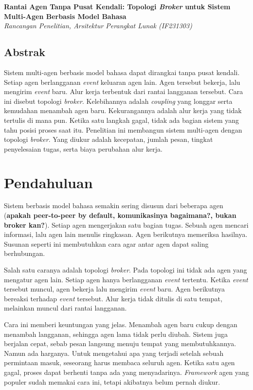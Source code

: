 \documentclass[11pt,a4paper]{article}
\begin{document}
\begin{center}
  {\LARGE\bfseries Rantai Agen Tanpa Pusat Kendali: Topologi \textit{Broker} untuk Sistem Multi-Agen Berbasis Model Bahasa}\\[0.6em]
  {\small\itshape Rancangan Penelitian, Arsitektur Perangkat Lunak (IF231303)}
\end{center}

\vspace{1em}

\subsection*{Abstrak}

Sistem multi-agen berbasis model bahasa dapat dirangkai tanpa pusat kendali. Setiap agen berlangganan \textit{event} keluaran agen lain. Agen tersebut bekerja, lalu mengirim \textit{event} baru. Alur kerja terbentuk dari rantai langganan tersebut. Cara ini disebut topologi \textit{broker}. Kelebihannya adalah \textit{coupling} yang longgar serta kemudahan menambah agen baru. Kekurangannya adalah alur kerja yang tidak tertulis di mana pun. Ketika satu langkah gagal, tidak ada bagian sistem yang tahu posisi proses saat itu. Penelitian ini membangun sistem multi-agen dengan topologi \textit{broker}. Yang diukur adalah kecepatan, jumlah pesan, tingkat penyelesaian tugas, serta biaya perubahan alur kerja.

\section{Pendahuluan}

Sistem berbasis model bahasa semakin sering disusun dari beberapa agen (\textbf{apakah peer-to-peer by default, komunikasinya bagaimana?, bukan broker kan?}). Setiap agen mengerjakan satu bagian tugas. Sebuah agen mencari informasi, lalu agen lain menulis ringkasan. Agen berikutnya memeriksa hasilnya. Susunan seperti ini membutuhkan cara agar antar agen dapat saling berhubungan.

Salah satu caranya adalah topologi \textit{broker}. Pada topologi ini tidak ada agen yang mengatur agen lain. Setiap agen hanya berlangganan \textit{event} tertentu. Ketika \textit{event} tersebut muncul, agen bekerja lalu mengirim \textit{event} baru. Agen berikutnya bereaksi terhadap \textit{event} tersebut. Alur kerja tidak ditulis di satu tempat, melainkan muncul dari rantai langganan.

Cara ini memberi keuntungan yang jelas. Menambah agen baru cukup dengan menambah langganan, sehingga agen lama tidak perlu diubah. Sistem juga berjalan cepat, sebab pesan langsung menuju tempat yang membutuhkannya. Namun ada harganya. Untuk mengetahui apa yang terjadi setelah sebuah permintaan masuk, seseorang harus membaca seluruh agen. Ketika satu agen gagal, proses dapat berhenti tanpa ada yang menyadarinya. \textit{Framework} agen yang populer sudah memakai cara ini, tetapi akibatnya belum pernah diukur.
\end{document}
